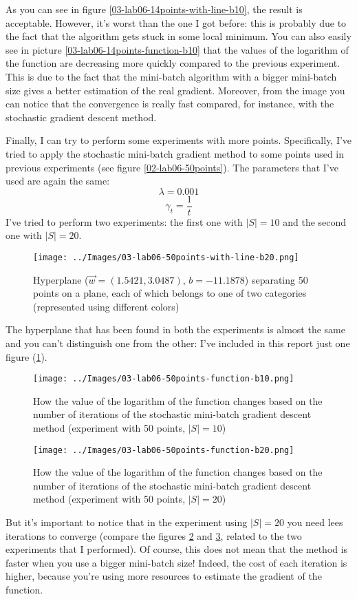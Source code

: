     As you can see in figure \ref{03-lab06-14points-with-line-b10}, the result is acceptable. However, it's worst than the one I got before: this is probably due to the fact that the algorithm gets stuck in some local minimum. You can also easily see in picture \ref{03-lab06-14points-function-b10} that the values of the logarithm of the function are decreasing more quickly compared to the previous experiment. This is due to the fact that the mini-batch algorithm with a bigger mini-batch size gives a better estimation of the real gradient. Moreover, from the image you can notice that the convergence is really fast compared, for instance, with the stochastic gradient descent method.\par
    Finally, I can try to perform some experiments with more points. Specifically, I've tried to apply the stochastic mini-batch gradient method to some points used in previous experiments (see figure \ref{02-lab06-50points}). The parameters that I've used are again the same:
    \[\lambda = 0.001\]
    \[\gamma_t = \frac{1}{t}\]
    I've tried to perform two experiments: the first one with \(|S| = 10\) and the second one with \(|S| = 20\).
    \begin{figure}
        \centering
        \texttt{[image: ../Images/03-lab06-50points-with-line-b20.png]}
        \caption{Hyperplane (\(\vec{w} = (1.5421, 3.0487)\), \(b=-11.1878\)) separating 50 points on a plane, each of which belongs to one of two categories (represented using different colors)}
        \label{03-lab06-50points-with-line-b20}
    \end{figure}
    The hyperplane that has been found in both the experiments is almost the same and you can't distinguish one from the other: I've included in this report just one figure (\ref{03-lab06-50points-with-line-b20}).
    \begin{figure}
        \centering
        \texttt{[image: ../Images/03-lab06-50points-function-b10.png]}
        \caption{How the value of the logarithm of the function changes based on the number of iterations of the stochastic mini-batch gradient descent method (experiment with 50 points, \(|S| = 10\))}
        \label{03-lab06-50points-function-b10}
    \end{figure}
    \begin{figure}
        \centering
        \texttt{[image: ../Images/03-lab06-50points-function-b20.png]}
        \caption{How the value of the logarithm of the function changes based on the number of iterations of the stochastic mini-batch gradient descent method (experiment with 50 points, \(|S| = 20\))}
        \label{03-lab06-50points-function-b20}
    \end{figure}
    But it's important to notice that in the experiment using \(|S|=20\) you need lees iterations to converge (compare the figures \ref{03-lab06-50points-function-b10} and \ref{03-lab06-50points-function-b20}, related to the two experiments that I performed). Of course, this does not mean that the method is faster when you use a bigger mini-batch size! Indeed, the cost of each iteration is higher, because you're using more resources to estimate the gradient of the function.